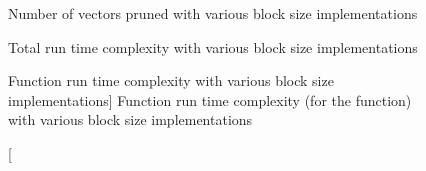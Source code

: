 \begin{figure}[H]
    \centering
    
    \caption{Number of vectors pruned with various block size implementations}
    \label{blockSizeProfiling:vectorsPruned}
\end{figure}

\begin{figure}[H]
    \centering
    
    \caption{Total run time complexity with various block size implementations}
    \label{blockSizeProfiling:totalRunTimeComplexity}
\end{figure}

\begin{figure}[H]
    \centering
    
    \caption
        [Function run time complexity with various block size implementations]
        {Function run time complexity (for the
             function) with various block
            size implementations}
    \label{blockSizeProfiling:functionRunTimeComplexity}
\end{figure}
